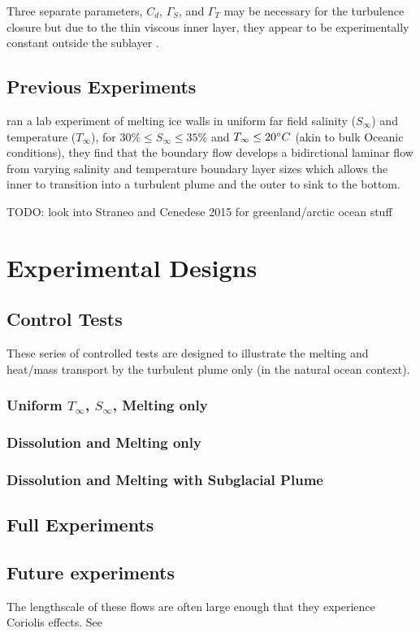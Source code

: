 \documentclass{article}
\begin{document}
Three separate parameters, $C_d$, $\Gamma_S$, and $\Gamma_T$ may be necessary for the turbulence closure but due to the thin viscous inner layer, they appear to be experimentally constant outside the sublayer \citep{jenkins_observation_2010}.


\subsection{Previous Experiments}
\cite{josberger_laboratory_1981} ran a lab experiment of melting ice walls in uniform far field salinity ($S_{\infty}$) and temperature ($T_{\infty}$), for $30 \% \leq S_{\infty} \leq 35 \%$ and $T_{\infty} \leq 20 \degree C$ (akin to bulk Oceanic conditions), they find that the boundary flow develops a bidirctional laminar flow from varying salinity and temperature boundary layer sizes which allows the inner to transition into a turbulent plume and the outer to sink to the bottom. 

TODO: look into Straneo and Cenedese 2015 for greenland/arctic ocean stuff

\section{Experimental Designs}
\subsection{Control Tests}
These series of controlled tests are designed to illustrate the melting and heat/mass transport by the turbulent plume only (in the natural ocean context). 
\subsubsection{Uniform $T_{\infty}$, $S_{\infty}$, Melting only }
\subsubsection{Dissolution and Melting only}
\subsubsection{Dissolution and Melting with Subglacial Plume}
\subsection{Full Experiments}
\subsection{Future experiments}
The lengthscale of these flows are often large enough that they experience Coriolis effects. See
\end{document}
